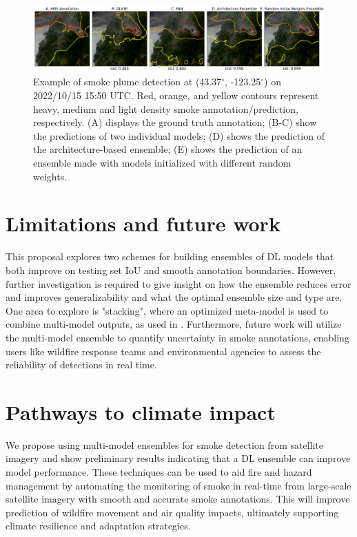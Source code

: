 \documentclass{article}
\begin{document}
\begin{figure}[h]
    \centering
    \includegraphics[width=\textwidth]{ensemble_panel_tinypaper.png}
    \caption{Example of smoke plume detection at (43.37$^{\circ}$, -123.25$^{\circ}$) on 2022/10/15 15:50 UTC. Red, orange, and yellow contours represent heavy, medium and light density smoke annotation/prediction, respectively. (A) displays the ground truth annotation; (B-C) show the predictions of two individual models; (D) shows the prediction of the architecture-based ensemble; (E) shows the prediction of an ensemble made with models initialized with different random weights.}
    \label{fig:ensemble_panel}
\end{figure}
\section{Limitations and future work} This proposal explores two schemes for building ensembles of DL models that both improve on testing set IoU and smooth annotation boundaries. However, further investigation is required to give insight on how the ensemble reduces error and improves generalizability and what the optimal ensemble size and type are. One area to explore is "stacking", where an optimized meta-model is used to combine multi-model outputs, as used in \cite{stacking-smoke-falcao, ensemble-fire-Sivanuja, stacking-wildfire-severity, pm2.5-stack, rainfall-stack}. Furthermore, future work will utilize the multi-model ensemble to quantify uncertainty in smoke annotations, enabling users like wildfire response teams and environmental agencies to assess the reliability of detections in real time. 

\section{Pathways to climate impact} We propose using multi-model ensembles for smoke detection from satellite imagery and show preliminary results indicating that a DL ensemble can improve model performance. These techniques can be used to aid fire and hazard management by automating the monitoring of smoke in real-time from large-scale satellite imagery with smooth and accurate smoke annotations. This will improve prediction of wildfire movement and air quality impacts, ultimately supporting climate resilience and adaptation strategies.
\end{document}
